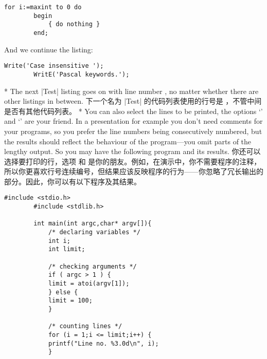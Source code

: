 \begin{paracol}{2}
\begin{lstsample}[name]{\lstset{numbers=left,numberstyle=\tiny,stepnumber=2,numbersep=5pt}}{}
        \begin{lstlisting}[name=Test]
        for i:=maxint to 0 do
        begin
            { do nothing }
        end;

        \end{lstlisting}
        And we continue the listing:
        \begin{lstlisting}[name=Test]
        Write('Case insensitive ');
        WritE('Pascal keywords.');
        \end{lstlisting}
\end{lstsample}
\switchcolumn[0]*%
The next |Test| listing goes on with line number {\makeatletter\lstno@Test},
no matter whether there are other listings in between.
\switchcolumn
下一个名为 |Test| 的代码列表使用的行号是 {\makeatletter\lstno@Test}，不管中间是否有其他代码列表。
\switchcolumn[0]*%
You can also select the lines to be printed, the options
`' and `' are your
friend. In a presentation for example you don't need comments for your
programs, so you prefer the line numbers being consecutively numbered,
but the results should reflect the behaviour of the program---you omit
parts of the lengthy output. So
you may have the following program and its results.
\switchcolumn
你还可以选择要打印的行，选项  和  是你的朋友。例如，在演示中，你不需要程序的注释，所以你更喜欢行号连续编号，但结果应该反映程序的行为——你忽略了冗长输出的部分。因此，你可以有以下程序及其结果。

\begin{lstsample}[name]{\lstset{numbers=left,numberstyle=\tiny,stepnumber=1,numbersep=5pt}}{}
        \begin{lstlisting}[name=Test,
            language={[ansi]C},
            linerange={1-4,6-7,10-14,
            17-19,21-22},
            firstnumber=1]
        #include <stdio.h>
        #include <stdlib.h>

        int main(int argc,char* argv[]){
            /* declaring variables */
            int i;
            int limit;

            /* checking arguments */
            if ( argc > 1 ) {
            limit = atoi(argv[1]);
            } else {
            limit = 100;
            }

            /* counting lines */
            for (i = 1;i <= limit;i++) {
            printf("Line no. %3.0d\n", i);
            }


\end{lstlisting}
\end{lstsample}
\end{paracol}
